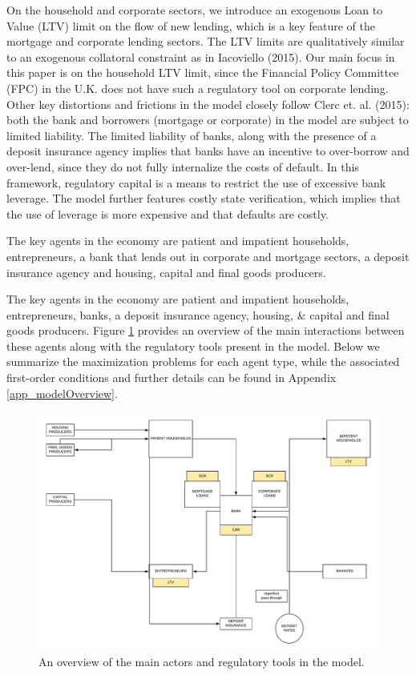 \documentclass[12pt]{article}
\numberwithin{equation}{section}
\begin{document}
On the household and corporate sectors, we introduce an exogenous Loan to Value (LTV) limit on the flow of new lending, which is a key feature of the mortgage and corporate lending sectors. The LTV limits are qualitatively similar to an exogenous collatoral constraint as in Iacoviello (2015). Our main focus in this paper is on the household LTV limit, since the Financial Policy Committee (FPC) in the U.K. does not have such a regulatory tool on corporate lending. Other key distortions and frictions in the model closely follow Clerc et. al. (2015): both the bank and borrowers (mortgage or corporate) in the model are subject to limited liability. The limited liability of banks, along with the presence of a deposit insurance agency implies that banks have an incentive to over-borrow and over-lend, since they do not fully internalize the costs of default. In this framework, regulatory capital is a means to restrict the use of excessive bank leverage. The model further features costly state verification, which implies that the use of leverage is more expensive and that defaults are costly. 

The key agents in the economy are patient and impatient households, entrepreneurs, a bank that lends out in corporate and mortgage sectors, a deposit insurance agency and housing, capital and final goods producers. 


The key agents in the economy are patient and impatient households, entrepreneurs, banks, a deposit insurance agency, housing, \& capital and final goods producers. Figure \ref{model_overview} provides an overview of the main interactions between these agents along with the regulatory tools present in the model. Below we summarize the maximization problems for each agent type, while the associated first-order conditions and further details can be found in Appendix \ref{app_modelOverview}.


\begin{figure}[H]
\caption{An overview of the main actors and regulatory tools in the model.}
\label{model_overview}
\includegraphics[scale=0.5]{3d_flowchart_prud.pdf}
\end{figure}
\end{document}

